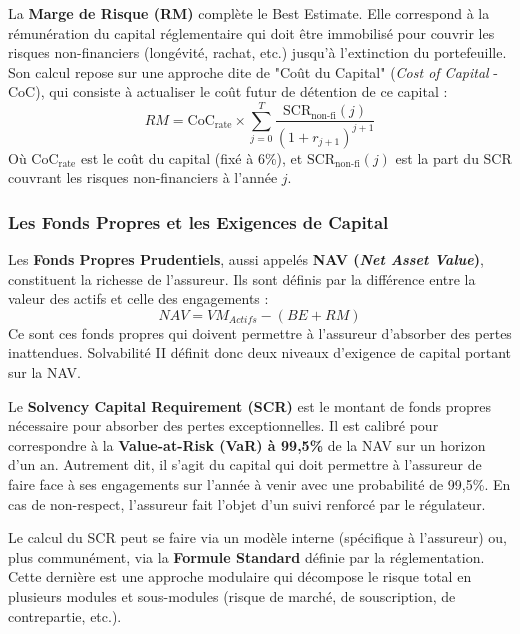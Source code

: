La \textbf{Marge de Risque (RM)} complète le Best Estimate. Elle correspond à la rémunération du capital réglementaire qui doit être immobilisé pour couvrir les risques non-financiers (longévité, rachat, etc.) jusqu'à l'extinction du portefeuille. Son calcul repose sur une approche dite de "Coût du Capital" (\textit{Cost of Capital} - CoC), qui consiste à actualiser le coût futur de détention de ce capital :
\begin{equation}
    RM = \text{CoC}_{\text{rate}} \times \sum_{j=0}^{T} \frac{\text{SCR}_{\text{non-fi}}(j)}{(1+r_{j+1})^{j+1}}
\end{equation}
Où $\text{CoC}_{\text{rate}}$ est le coût du capital (fixé à 6\%), et $\text{SCR}_{\text{non-fi}}(j)$ est la part du SCR couvrant les risques non-financiers à l'année $j$.


\subsubsection{Les Fonds Propres et les Exigences de Capital}
\bigskip


Les \textbf{Fonds Propres Prudentiels}, aussi appelés \textbf{NAV (\textit{Net Asset Value})}, constituent la richesse de l'assureur. Ils sont définis par la différence entre la valeur des actifs et celle des engagements :
\begin{equation}
    NAV = VM_{Actifs} - (BE + RM)
\end{equation}
Ce sont ces fonds propres qui doivent permettre à l'assureur d'absorber des pertes inattendues. Solvabilité II définit donc deux niveaux d'exigence de capital portant sur la NAV.
\bigskip


Le \textbf{Solvency Capital Requirement (SCR)} est le montant de fonds propres nécessaire pour absorber des pertes exceptionnelles. Il est calibré pour correspondre à la \textbf{Value-at-Risk (VaR) à 99,5\%} de la NAV sur un horizon d'un an. Autrement dit, il s'agit du capital qui doit permettre à l'assureur de faire face à ses engagements sur l'année à venir avec une probabilité de 99,5\%. En cas de non-respect, l'assureur fait l'objet d'un suivi renforcé par le régulateur.

Le calcul du SCR peut se faire via un modèle interne (spécifique à l'assureur) ou, plus communément, via la \textbf{Formule Standard} définie par la réglementation. Cette dernière est une approche modulaire qui décompose le risque total en plusieurs modules et sous-modules (risque de marché, de souscription, de contrepartie, etc.).

